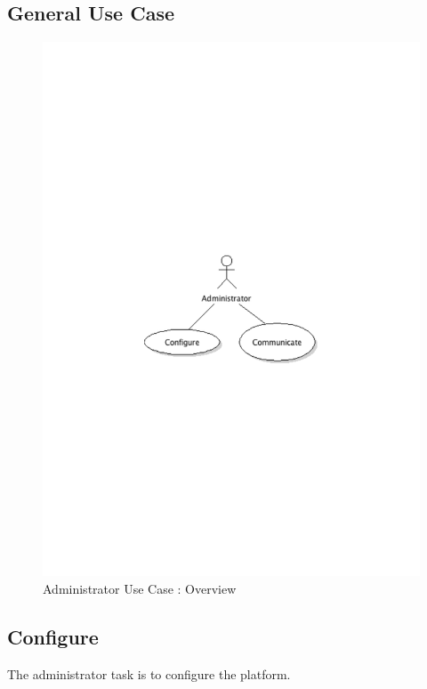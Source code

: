 	\subsection{General Use Case}
		\begin{figure}[ht]
			\begin{center}
				\includegraphics[width=\textwidth, trim=2cm 10cm 2cm 11cm]{UML_figure/UC/administrator/UC_Administrator_General.pdf}
				\caption{Administrator Use Case : Overview}
			\end{center}
		\end{figure}
	\subsection{Configure}
		The administrator task is to configure the platform.
\newpage

